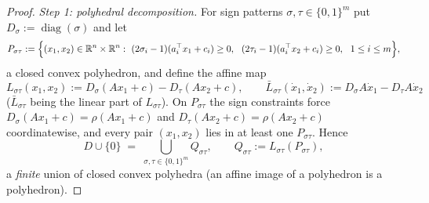 \documentclass[11pt]{article}
\numberwithin{equation}{section}
\theoremstyle{remark}
\newcommand{\R}{\mathbb{R}}
\DeclareMathOperator{\diag}{diag}
\begin{document}
\begin{proof}
\emph{Step 1: polyhedral decomposition.}
For sign patterns $\sigma,\tau\in\{0,1\}^m$ put $D_\sigma:=\diag(\sigma)$ and let
\[
P_{\sigma\tau}:=\Bigl\{(x_1,x_2)\in\R^n\times\R^n :\ (2\sigma_i-1)(a_i^{\top}x_1+c_i)\ge 0,\ \ (2\tau_i-1)(a_i^{\top}x_2+c_i)\ge 0,\ \ 1\le i\le m\Bigr\},
\]
a closed convex polyhedron, and define the affine map
\[
L_{\sigma\tau}(x_1,x_2):=D_\sigma(Ax_1+c)-D_\tau(Ax_2+c),
\qquad
\bar L_{\sigma\tau}(\dot x_1,\dot x_2):=D_\sigma A\dot x_1-D_\tau A\dot x_2
\]
($\bar L_{\sigma\tau}$ being the linear part of $L_{\sigma\tau}$). On $P_{\sigma\tau}$ the sign constraints force $D_\sigma(Ax_1+c)=\rho(Ax_1+c)$ and $D_\tau(Ax_2+c)=\rho(Ax_2+c)$ coordinatewise, and every pair $(x_1,x_2)$ lies in at least one $P_{\sigma\tau}$. Hence
\[
D\cup\{0\}\;=\;\bigcup_{\sigma,\tau\in\{0,1\}^m} Q_{\sigma\tau},
\qquad Q_{\sigma\tau}:=L_{\sigma\tau}(P_{\sigma\tau}),
\]
a \emph{finite} union of closed convex polyhedra (an affine image of a polyhedron is a polyhedron).


\end{proof}
\end{document}
